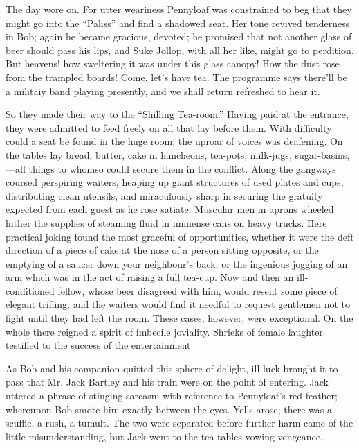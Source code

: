 The day wore on. For utter weariness Pennyloaf was constrained to beg
that they might go into the ``Paliss'' and find a shadowed seat. Her
tone revived tenderness in Bob; again he became gracious, devoted; he
promised that not another glass of beer should pass his lips, and Suke
Jollop, with all her like, might go to perdition. But heavens! how
sweltering it was under this glass canopy! How the dust rose from the
trampled boards! {\protect\hypertarget{262}{}{}}Come, let's have tea.
The programme says there'll be a militaiy band playing presently, and we
shall return refreshed to hear it.

So they made their way to the ``Shilling Tea-room.'' Having paid at the
entrance, they were admitted to feed freely on all that lay before them.
With difficulty could a seat be found in the huge room; the uproar of
voices was deafening. On the tables lay bread, butter, cake in
huncheons, tea-pots, milk-jugs, sugar-basins,---all things to whomso
could secure them in the conflict. Along the gangways coursed perspiring
waiters, heaping up giant structures of used plates and cups,
distributing clean utensils, and miraculously sharp in securing the
gratuity expected from each guest as he rose satiate. Muscular men in
aprons wheeled hither the supplies of steaming fluid in immense cans on
heavy trucks. Here practical joking found the most graceful of
opportunities, whether it were the deft direction of a piece of cake at
the nose of a person sitting opposite, or the emptying of a saucer down
your neighbour's back, or the ingenious
{\protect\hypertarget{263}{}{}}jogging of an arm which was in the act of
raising a full tea-cup. Now and then an ill-conditioned fellow, whose
beer disagreed with him, would resent some piece of elegant trifling,
and the waiters would find it needful to request gentlemen not to fight
until they had left the room. These cases, however, were exceptional. On
the whole there reigned a spirit of imbecile joviality. Shrieks of
female laughter testified to the success of the entertainment

As Bob and his companion quitted this sphere of delight, ill-luck
brought it to pass that Mr. Jack Bartley and his train were on the point
of entering. Jack uttered a phrase of stinging sarcasm with reference to
Pennyloaf's red feather; whereupon Bob smote him exactly between the
eyes. Yells arose; there was a scuffle, a rush, a tumult. The two were
separated before further harm came of the little misunderstanding, but
Jack went to the tea-tables vowing vengeance.

